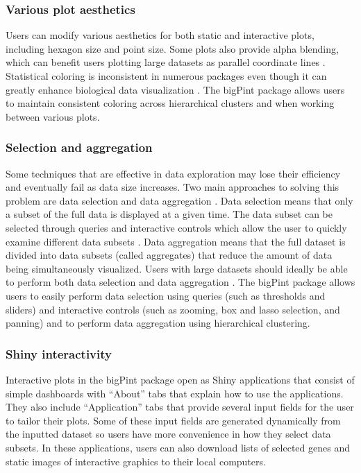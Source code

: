 \documentclass[parskip=full]{bmcart}
\begin{document}
\subsubsection*{Various plot aesthetics}

Users can modify various aesthetics for both static and interactive plots, including hexagon size and point size. Some plots also provide alpha blending, which can benefit users plotting large datasets as parallel coordinate lines \cite{unwin2007computational}. Statistical coloring is inconsistent in numerous packages even though it can greatly enhance biological data visualization \cite{yin2012ggbio}. The bigPint package allows users to maintain consistent coloring across hierarchical clusters and when working between various plots.

\subsubsection*{Selection and aggregation}

Some techniques that are effective in data exploration may lose their efficiency and eventually fail as data size increases. Two main approaches to solving this problem are data selection and data aggregation \cite{andrienko2005blending}. Data selection means that only a subset of the full data is displayed at a given time. The data subset can be selected through queries and interactive controls which allow the user to quickly examine different data subsets \cite{andrienko2005blending}. Data aggregation means that the full dataset is divided into data subsets (called aggregates) that reduce the amount of data being simultaneously visualized. Users with large datasets should ideally be able to perform both data selection and data aggregation \cite{andrienko2005blending}. The bigPint package allows users to easily perform data selection using queries (such as thresholds and sliders) and interactive controls (such as zooming, box and lasso selection, and panning) and to perform data aggregation using hierarchical clustering. 

\subsubsection*{Shiny interactivity}

Interactive plots in the bigPint package open as Shiny applications that consist of simple dashboards with ``About'' tabs that explain how to use the applications. They also include ``Application'' tabs that provide several input fields for the user to tailor their plots. Some of these input fields are generated dynamically from the inputted dataset so users have more convenience in how they select data subsets. In these applications, users can also download lists of selected genes and static images of interactive graphics to their local computers. 
\end{document}

